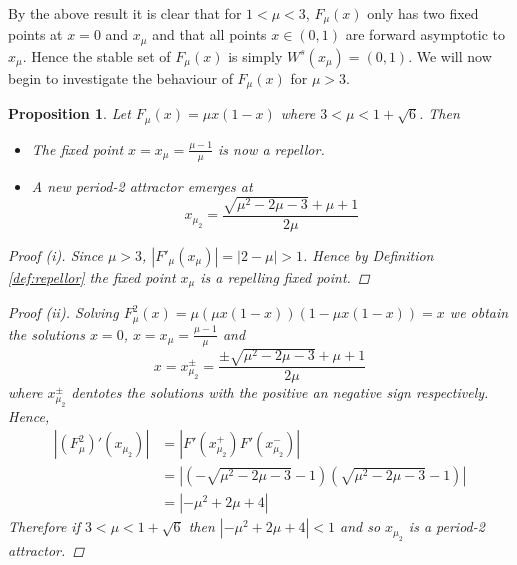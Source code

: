 \documentclass[11pt,a4paper,oneside]{memoir}
\theoremstyle{plain}
\newtheorem{prop}[thm]{Proposition}
\theoremstyle{definition}
\begin{document}
By the above result it is clear that for $1 < \mu < 3$, $F_\mu(x)$ only has two fixed points at $x = 0$ and $x_\mu$ and that all points $x \in (0, 1)$ are forward asymptotic to $x_\mu$. Hence the stable set of $F_\mu(x)$ is simply $W^s(x_\mu) = (0, 1)$. We will now begin to investigate the behaviour of $F_\mu(x)$ for $\mu > 3$.

\begin{prop} \label{prop:logistic3}
    Let $F_\mu(x) = \mu x (1-x)$ where $3 < \mu < 1 + \sqrt{6}$. Then
    \begin{itemize}
        \item[(i)] The fixed point $x = x_\mu = \frac{\mu - 1}{\mu}$ is now a repellor.
        \item[(ii)] A new period-2 attractor emerges at \[x_{\mu_2} = \frac{\sqrt{\mu^2 - 2\mu - 3} + \mu + 1}{2\mu}\]
    \end{itemize}
    \begin{proof}[Proof (i)]
        Since $\mu > 3$, $|F'_\mu(x_\mu)| = |2-\mu| > 1$. Hence by Definition \ref{def:repellor} the fixed point $x_\mu$ is a repelling fixed point.
    \end{proof}
    \begin{proof}[Proof (ii)]
        Solving $F^2_\mu(x) = \mu(\mu x(1-x))(1-\mu x(1-x)) = x$ we obtain the solutions $x = 0$, $x = x_\mu = \frac{\mu - 1}{\mu}$ and \[x = x^\pm_{\mu_2} = \frac{\pm\sqrt{\mu^2 - 2\mu - 3} + \mu + 1}{2\mu}\] where $x^\pm_{\mu_2}$ dentotes the solutions with the positive an negative sign respectively. Hence,
        \begin{align*}
        \left\lvert (F_\mu^2)'(x_{\mu_2})\right\rvert &= \left\lvert F'(x^+_{\mu_2}) F'(x^-_{\mu_2}) \right\rvert \\ &= \left\lvert \left( - \sqrt{\mu^2 - 2\mu - 3} - 1 \right) \left( \sqrt{\mu^2 - 2\mu - 3} - 1\right) \right\rvert \\ &= \left\lvert -\mu^2 + 2\mu + 4 \right\rvert
        \end{align*}
        Therefore if $3 < \mu < 1 + \sqrt{6}$ then $\left\lvert -\mu^2 + 2\mu + 4 \right\rvert < 1$ and so $x_{\mu_2}$ is a period-2 attractor.
    \end{proof}
\end{prop}
\end{document}
